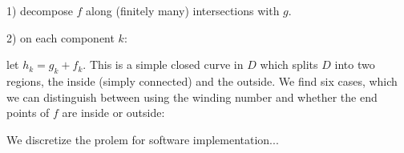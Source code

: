 \documentclass[12pt,a4paper]{article}
\begin{document}

1) decompose $f$ along (finitely many) intersections
with $g.$


2) on each component $k$:


let $h_k = g_k + f_k.$
This is a simple closed curve in $D$ which splits $D$
into two regions, the inside (simply connected) and the
outside.
We find six cases, which we can distinguish between
using the winding number and whether the end points
of $f$ are inside or outside:





We discretize the prolem for software implementation...




%

%
%
%
%
%
%
%
%
%
\end{document}
